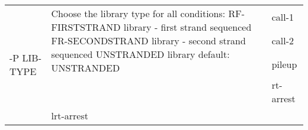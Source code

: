 {\small
\begin{tabular}{@{}p{}p{}l@{}}
\multirow{5}{=}{-P LIB-TYPE} & \multirow{3}{=}{Choose the library type for all conditions:
RF-FIRSTSTRAND	library - first strand sequenced
FR-SECONDSTRAND	library - second strand sequenced
UNSTRANDED	library
default: UNSTRANDED} & call-1 \\
 & & call-2 \\
 & & pileup \\
 & & rt-arrest \\
 & lrt-arrest \\
\end{tabular}\\
}
